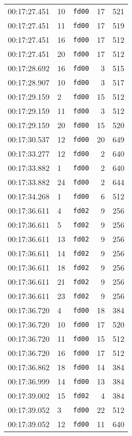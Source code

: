 \documentclass{article}
\begin{document}
\begin{longtable}{lllrr}
00:17:27.451 & 10 & \texttt{fd00} & 17 & 521 \\
00:17:27.451 & 11 & \texttt{fd00} & 17 & 519 \\
00:17:27.451 & 16 & \texttt{fd00} & 17 & 512 \\
00:17:27.451 & 20 & \texttt{fd00} & 17 & 512 \\
00:17:28.692 & 16 & \texttt{fd00} & 3 & 515 \\
00:17:28.907 & 10 & \texttt{fd00} & 3 & 517 \\
00:17:29.159 & 2 & \texttt{fd00} & 15 & 512 \\
00:17:29.159 & 11 & \texttt{fd00} & 3 & 512 \\
00:17:29.159 & 20 & \texttt{fd00} & 15 & 520 \\
00:17:30.537 & 12 & \texttt{fd00} & 20 & 649 \\
00:17:33.277 & 12 & \texttt{fd00} & 2 & 640 \\
00:17:33.882 & 1 & \texttt{fd00} & 2 & 640 \\
00:17:33.882 & 24 & \texttt{fd00} & 2 & 644 \\
00:17:34.268 & 1 & \texttt{fd00} & 6 & 512 \\
00:17:36.611 & 4 & \texttt{fd02} & 9 & 256 \\
00:17:36.611 & 5 & \texttt{fd02} & 9 & 256 \\
00:17:36.611 & 13 & \texttt{fd02} & 9 & 256 \\
00:17:36.611 & 14 & \texttt{fd02} & 9 & 256 \\
00:17:36.611 & 18 & \texttt{fd02} & 9 & 256 \\
00:17:36.611 & 21 & \texttt{fd02} & 9 & 256 \\
00:17:36.611 & 23 & \texttt{fd02} & 9 & 256 \\
00:17:36.720 & 4 & \texttt{fd00} & 18 & 384 \\
00:17:36.720 & 10 & \texttt{fd00} & 17 & 520 \\
00:17:36.720 & 11 & \texttt{fd00} & 15 & 512 \\
00:17:36.720 & 16 & \texttt{fd00} & 17 & 512 \\
00:17:36.862 & 18 & \texttt{fd00} & 14 & 384 \\
00:17:36.999 & 14 & \texttt{fd00} & 13 & 384 \\
00:17:39.002 & 15 & \texttt{fd02} & 4 & 384 \\
00:17:39.052 & 3 & \texttt{fd00} & 22 & 512 \\
00:17:39.052 & 12 & \texttt{fd00} & 11 & 640 \\

\end{longtable}
\end{document}
